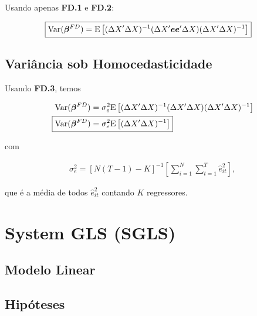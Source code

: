 \documentclass[11pt, oneside, a4paper, article]{article}
\numberwithin{equation}{section}
\begin{document}
\begin{description}
\begin{description}
Usando apenas \textbf{FD.1} e \textbf{FD.2}:

\vspace{-1 em}
\begin{align*} 
\Aboxed{
\Var( \mbs{\beta}^{FD} ) = 
\E \left[
( \Delta X' \Delta X )^{-1}
( \Delta X' \mbs{e}  \mbs{e}' \Delta X )
( \Delta X' \Delta X )^{-1} 
\right]}
\end{align*}

\subsection*{Variância sob Homocedasticidade}

Usando \textbf{FD.3}, temos

\vspace{-1 em}
\begin{align*} 
\Var( \mbs{\beta}^{FD} ) &= 
\sigma_{e}^{2}
\E \left[
( \Delta X' \Delta X )^{-1}
( \Delta X' \Delta X )
( \Delta X' \Delta X )^{-1} 
\right]
\\
\Aboxed{
\Var( \mbs{\beta}^{FD} ) &= 
\sigma^2_{e}
\E \left[
( \Delta X' \Delta X )^{-1} 
\right]}
\end{align*}

\noindent 
com

\vspace{-1 em}
\begin{align*} 
\sigma^2_{e} = 
\left[ N ( T - 1 ) - K \right]^{-1}
\left[  
\sum_{i=1}^{N} 
\sum_{t=1}^{T}
\hat{e}_{it}^{2}
\right],
\end{align*}

\noindent
que é a média de todos $\hat{e}^{2}_{it}$ contando $K$ regressores.

\clearpage
\section{System GLS (SGLS)}

\noindent
\citet[Sec.7.4 -- Consistency and Asymptotic Normality of Generalized Least Squares, p.153]{wool-2010} 

\subsection{Modelo Linear}

\subsection{Hipóteses}


\end{description}
\end{description}
\end{document}
